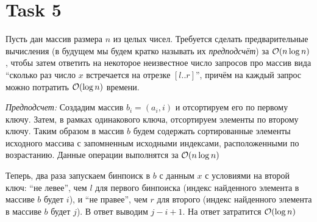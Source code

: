\section{Task 5}
\begin{task}
    Пусть дан массив размера $n$ из целых чисел. 
    Требуется сделать предварительные вычисления (в будущем мы будем кратко называть их \textit{предподсчёт}) за 
    $\mathcal{O}(n\log n)$, чтобы затем ответить на некоторое неизвестное число запросов про массив вида 
    ``сколько раз число $x$ встречается на отрезке $[l..r]$'', 
    причём на каждый запрос можно потратить $\mathcal{O}(\log n)$ времени.
\end{task}
\begin{solution}
    
    \textit{Предподсчет:} Создадим массив $b_i = (a_i, i)$ и отсортируем его по первому ключу. Затем, в рамках одинакового ключа, отсортируем элементы по второму ключу. Таким образом в массив $b$ будем содержать сортированные элементы исходного массива с запомненным исходными индексами, расположенными по возрастанию. Данные операции выполнятся за $\mathcal{O}(n\log n)$

    Теперь, два раза запускаем бинпоиск в $b$ с данным $x$ с условиями на второй ключ: ``не левее'', чем $l$ для первого бинпоиска (индекс найденного элемента в массиве $b$ будет $i$), и ``не правее'', чем $r$ для второго (индекс найденного элемента в массиве $b$ будет $j$). В ответ выводим $j-i+1$. На ответ затратится $\mathcal{O}(\log n)$
\end{solution}